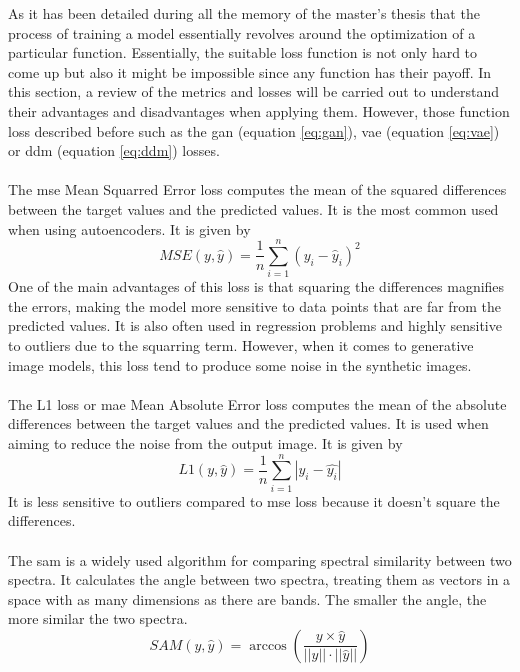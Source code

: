 As it  has been detailed during all the memory of the master's thesis that the process of training a model essentially revolves around the optimization of a particular function. Essentially, the suitable loss function is not only hard to come up but also it might be impossible since any function has their payoff. In this section, a review of the metrics and losses will be carried out to understand their advantages and disadvantages when applying them. However, those function loss described before such as the \gls{gan} (equation \ref{eq:gan}), \gls{vae} (equation \ref{eq:vae}) or \gls{ddm} (equation \ref{eq:ddm}) losses.
\\\\
The \gls{mse} Mean Squarred Error loss computes the mean of the squared differences between the target values and the predicted values. It is the most common used when using autoencoders. It is given by
\[MSE(y, \hat{y}) = \frac{1}{n} \sum_{i=1}^{n}(y_i - \hat{y}_i)^2\]
One of the main advantages of this loss is that squaring the differences magnifies the errors, making the model more sensitive to data points that are far from the predicted values. It is also often used in regression problems and highly sensitive to outliers due to the squarring term. However, when it comes to generative image models, this loss tend to produce some noise in the synthetic images.
\\\\
The L1 loss or \gls{mae} Mean Absolute Error loss computes the mean of the absolute differences between the target values and the predicted values. It is used when aiming to reduce the noise from the output image. It is given by
\[L1(y, \hat{y}) = \frac{1}{n} \sum_{i=1}^{n}|y_i-\hat{y_i}|\]
It is less sensitive to outliers compared to \gls{mse} loss because it doesn't square the differences. 
\\
\\
The \gls{sam} is a widely used algorithm for comparing spectral similarity between two spectra. It calculates the angle between two spectra, treating them as vectors in a space with as many dimensions as there are bands. The smaller the angle, the more similar the two spectra.
\[SAM(y, \hat{y}) = \arccos (\frac{y \times \hat{y}}{||y|| \cdot ||\hat{y}||})\]

